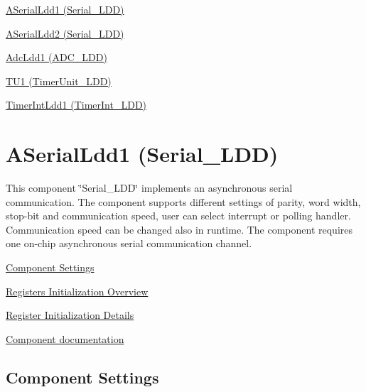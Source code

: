 
\begin{DoxyItemize}
\item \hyperlink{ASerialLdd1}{A\+Serial\+Ldd1 (Serial\+\_\+\+L\+DD)}
\item \hyperlink{ASerialLdd2}{A\+Serial\+Ldd2 (Serial\+\_\+\+L\+DD)}
\item \hyperlink{AdcLdd1}{Adc\+Ldd1 (A\+D\+C\+\_\+\+L\+DD)}
\item \hyperlink{TU1}{T\+U1 (Timer\+Unit\+\_\+\+L\+DD)}
\item \hyperlink{TimerIntLdd1}{Timer\+Int\+Ldd1 (Timer\+Int\+\_\+\+L\+DD)} 
\end{DoxyItemize}\hypertarget{ASerialLdd1}{}\section{A\+Serial\+Ldd1 (Serial\+\_\+\+L\+DD)}\label{ASerialLdd1}
This component \char`\"{}\+Serial\+\_\+\+L\+D\+D\char`\"{} implements an asynchronous serial communication. The component supports different settings of parity, word width, stop-\/bit and communication speed, user can select interrupt or polling handler. Communication speed can be changed also in runtime. The component requires one on-\/chip asynchronous serial communication channel.


\begin{DoxyItemize}
\item \hyperlink{ASerialLdd1_settings}{Component Settings}
\item \hyperlink{ASerialLdd1_regs_overview}{Registers Initialization Overview}
\item \hyperlink{ASerialLdd1_regs_details}{Register Initialization Details}
\item \hyperlink{group___a_serial_ldd1__module}{Component documentation} 
\end{DoxyItemize}\hypertarget{ASerialLdd1_settings}{}\subsection{Component Settings}\label{ASerialLdd1_settings}

